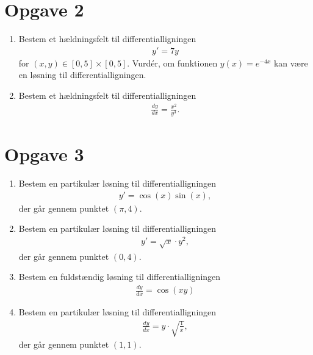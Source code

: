 \section*{Opgave 2}
\begin{enumerate}[label=\roman*)]
	\item Bestem et hældningsfelt til differentialligningen
	\begin{align*}
		y' = 7y
	\end{align*}
	for $(x,y)\in [0,5]\times [0,5]$.
	Vurdér, om funktionen $y(x) = e^{-4x}$ kan være en løsning til differentialligningen. 
	\item Bestem et hældningsfelt til differentialligningen
	\begin{align*}
		\frac{dy}{dx} = \frac{x^2}{y^3}.
	\end{align*}
\end{enumerate}

\section*{Opgave 3}
\begin{enumerate}[label=\roman*)]
	\item Bestem en partikulær løsning til differentialligningen 
	\begin{align*}
		y' = \cos(x)\sin(x),
	\end{align*}
	der går gennem punktet $(\pi,4)$. 
	\item Bestem en partikulær løsning til differentialligningen 
	\begin{align*}
		y' = \sqrt{x}\cdot y^2,
	\end{align*}
	der går gennem punktet $(0,4)$.
	\item Bestem en fuldstændig løsning til differentialligningen
	\begin{align*}
		\frac{dy}{dx} = \cos(xy)
	\end{align*}
	\item Bestem en partikulær løsning til differentialligningen
	\begin{align*}
		\frac{dy}{dx} = y\cdot \sqrt{\frac{1}{x}},
	\end{align*} 
	der går gennem punktet $(1,1)$.
\end{enumerate}

